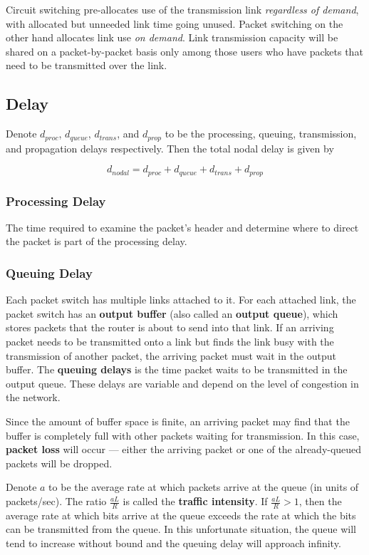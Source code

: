 \documentclass[11pt]{article}
\begin{document}
Circuit switching pre-allocates use of the transmission link \textit{regardless of demand}, with allocated but unneeded link time going unused. Packet switching on the other hand allocates link use \textit{on demand}. Link transmission capacity will be shared on a packet-by-packet basis only among those users who have packets that need to be transmitted over the link.

\subsection{Delay}

Denote $d_{proc}$, $d_{queue}$, $d_{trans}$, and $d_{prop}$ to be the processing, queuing, transmission, and propagation delays respectively. Then the total nodal delay is given by

\[
	d_{nodal} = d_{proc} + d_{queue} + d_{trans} + d_{prop}
\]

\subsubsection{Processing Delay}

The time required to examine the packet’s header and determine where to direct the packet is part of the processing delay.

\subsubsection{Queuing Delay}

Each packet switch has multiple links attached to it. For each attached link, the packet switch has an \textbf{output buffer} (also called an \textbf{output queue}), which stores packets that the router is about to send into that link. If an arriving packet needs to be transmitted onto a link but finds the link busy with the transmission of another packet, the arriving packet must wait in the output buffer. The \textbf{queuing delays} is the time packet waits to be transmitted in the output queue. These delays are variable and depend on the level of congestion in the network. 

Since the amount of buffer space is finite, an arriving packet may find that the buffer is completely full with other packets waiting for transmission. In this case, \textbf{packet loss} will occur --- either the arriving packet or one of the already-queued packets will be dropped.

Denote $a$ to be the average rate at which packets arrive at the queue (in units of packets/sec). The ratio $\frac{aL}{R}$ is called the \textbf{traffic intensity}. If  $\frac{aL}{R} > 1$, then the average rate at which bits arrive at the queue exceeds the rate at which the bits can be transmitted from the queue. In this unfortunate situation, the queue will tend to increase without bound and the queuing delay will approach infinity.
\end{document}
